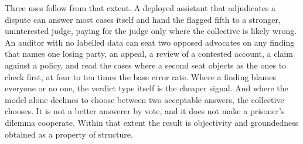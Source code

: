 Three uses follow from that extent. A deployed assistant that adjudicates a dispute can answer
most cases itself and hand the flagged fifth to a stronger, uninterested
judge, paying for the judge only where the collective is likely wrong. An
auditor with no labelled data can seat two opposed advocates on any finding
that names one losing party, an appeal, a review of a contested account, a
claim against a policy, and read the cases where a second seat objects as
the ones to check first, at four to ten times the base error rate. Where a finding
blames everyone or no one, the verdict type itself is the cheaper signal.
And where the model alone declines to choose between two acceptable
answers, the collective chooses. It is not a better answerer by vote, and
it does not make a prisoner's dilemma cooperate. Within that extent the
result is objectivity and groundedness obtained as a property of structure.
